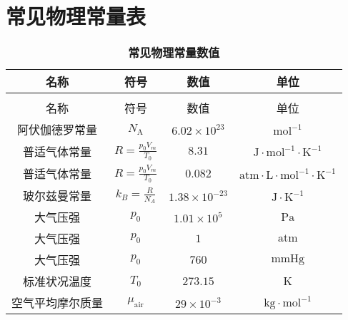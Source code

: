 \documentclass[zihao=-4,UTF8]{report}
\begin{document}




\newpage
\nocite{*}



\newpage
\appendix
{}
\titleformat{\subsection}{\normalsize\bfseries}{\thesubsection}{1em}{}

\section{常见物理常量表}
\begin{longtable}[H]{cccc}
     \caption{\textbf{常见物理常量数值}}\\
     \toprule
     名称 & 符号&  数值& 单位\\
     \midrule
     \endfirsthead
     \bottomrule
     \endfoot

     \toprule
     \multicolumn{4}{c}{\textbf{续上表}}\\
     \midrule
     名称 & 符号&  数值& 单位\\
     \midrule
     \endhead
     \bottomrule
     \endlastfoot
     阿伏伽德罗常量& $N_\text{A}$ & $6.02\times 10^{23}  $ & $\mathrm{mol}^{-1}$\\
     普适气体常量& $R=\frac{p_0V_m}{T_0} $& $8.31$& $\mathrm{J\cdot mol^{-1} \cdot K^{-1}}$\\
     普适气体常量& $R=\frac{p_0V_m}{T_0} $& $0.082$& $\mathrm{atm\cdot L\cdot mol^{-1} \cdot K^{-1}}$\\ 
     玻尔兹曼常量& $k_B=\frac{R}{N_A} $& $1.38\times10^{-23}$& $\mathrm{J\cdot K^{-1}}$\\
     大气压强& $p_0$& $1.01\times 10^5$& $\mathrm{Pa}$\\
     大气压强& $p_0$& $1$& $\mathrm{atm}$\\
     大气压强& $p_0$& $760$& $\mathrm{mmHg}$\\
     标准状况温度& $T_0$& $273.15$& $\mathrm{K}$\\
     空气平均摩尔质量& $\mu_{\text{air}}$& $29\times 10^{-3}$& $\mathrm{kg\cdot mol^{-1}}$
  \end{longtable}
  
\end{document}
